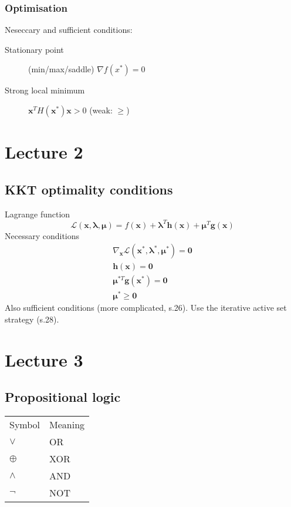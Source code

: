 \documentclass[a4paper,twocolumn,10pt]{article}
\begin{document}
\subsubsection{Optimisation}
Neseccary and sufficient conditions:
\begin{description}
    \item[Stationary point] (min/max/saddle) $\nabla f\left(x^{*}\right)=0$
    \item[Strong local minimum] $\boldsymbol{x}^{T} H\left(\boldsymbol{x}^{*}\right) \boldsymbol{x}>0$ (weak: $\geq$) 
\end{description}

\section{Lecture 2}
\subsection{KKT optimality conditions}
Lagrange function
\begin{equation}
    \mathcal{L}\left(\boldsymbol{x}, \boldsymbol{\lambda}, \boldsymbol{\mu}\right)= f\left(\boldsymbol{x}\right)+\boldsymbol{\lambda}^{T} \boldsymbol{h}\left(\boldsymbol{x}\right)+\boldsymbol{\mu}^{T} \boldsymbol{g}\left(\boldsymbol{x}\right)
\end{equation}
Necessary conditions
\begin{align}
    \nabla_{\boldsymbol{x}} \mathcal{L}\left(\boldsymbol{x}^{*}, \boldsymbol{\lambda}^{*}, \boldsymbol{\mu}^{*}\right)=\mathbf{0} \\
    \boldsymbol{h}(\boldsymbol{x})=\mathbf{0} \\
    \boldsymbol{\mu}^{* T} \boldsymbol{g}\left(\boldsymbol{x}^{*}\right)=\mathbf{0} \\
    \boldsymbol{\mu}^{*} \geq \mathbf{0}
\end{align}
Also sufficient conditions (more complicated, s.26).
Use the iterative active set strategy (s.28).

\section{Lecture 3}
\subsection{Propositional logic}
\begin{tabular}{@{}ll@{}}
    Symbol      & Meaning   \\
    $\vee$      & OR        \\
    $\oplus$    & XOR       \\
    $\wedge$    & AND       \\
    $\neg$      & NOT       
\end{tabular}
\end{document}
